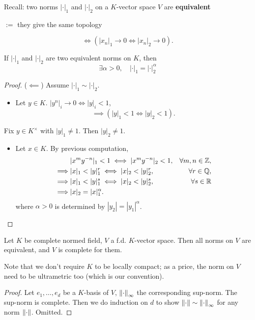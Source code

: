 Recall: two norms $|\cdot|_1$ and $|\cdot|_2$
on a $K$-vector space $V$ are \textbf{equivalent} \begin{center}
    $:=$ they give the same topology
\end{center}\[\iff (|x_n|_1\to 0\iff |x_n|_2\to 0).\]
\begin{proposition}
    If $|\cdot|_1$ and $|\cdot|_2$ are two equivalent norms on $K$, then \[\exists\alpha > 0,\quad |\cdot|_1 = |\cdot|_2^\alpha\]
\end{proposition}
\begin{proof}
    ($\impliedby$) Assume $|\cdot|_1\sim|\cdot|_2$.
    \begin{itemize}
\item Let $y\in K$. $|y^n|_i\to 0\iff |y|_i < 1$,
\[\implies \left( |y|_1 < 1\iff |y|_2 < 1 \right).\]
    \end{itemize}
Fix $y\in K^\times$ with $|y|_1\ne 1$. Then $|y|_2\ne 1$.
\begin{itemize}
    \item Let $x\in K$.
    By previous computation, 
    \begin{align*}
        &{} |x^my^{-n}|_1 < 1\iff |x^my^{-n}|_2 < 1, &\forall m, n\in\mathbb{Z},\\
    \implies &{} |x|_1 < |y|_1^{r}\iff |x|_2 < |y|_2^{r}, &\forall r\in\mathbb{Q},\\
    \implies &{} |x|_1 < |y|_1^{s}\iff |x|_2 < |y|_2^{s}, &\forall s\in\mathbb{R}\\
    \implies &{} |x|_2 = |x|_1^{\alpha}. &
    \end{align*}
    where $\alpha > 0$ is determined by $|y_2| = |y_1|^\alpha$.\qedhere
\end{itemize}
\end{proof}
\begin{theorem}[Artin]\label{f.d. vector space over complete normed field is complete with all norms equivalent}
    Let $K$ be complete normed field, $V$ a f.d. $K$-vector space.
    Then all norms on $V$ are equivalent, and $V$ is complete for them.
\end{theorem}
Note that we don't require $K$ to be locally compact; as a price, the norm on $V$ need to be ultrametric too (which is our convention).
\begin{proof}
    Let $e_1, \dots, e_d$ be a $K$-basis of $V$, $\left\| \cdot\right\|_{\infty}$ the corresponding sup-norm. The sup-norm is complete.
    Then we do induction on $d$ to show $\left\| \cdot\right\|\sim \left\| \cdot\right\|_{\infty}$ for any norm $\left\| \cdot\right\|$. Omitted.
\end{proof}

